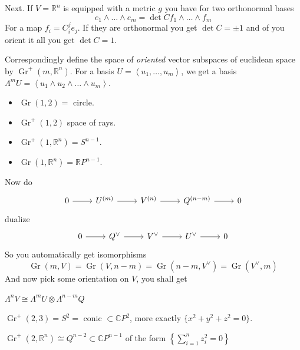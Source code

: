 Next. If \(V=\mathbb{R}^n\) is equipped with a metric \(g\) you have for two orthonormal bases
\[e_1 \wedge \ldots \wedge e_m=\det C f_1\wedge \ldots \wedge f_m\]
For a map \(f_i=C_i^j e_j\). If they are orthonormal you get \(\det C=\pm 1\) and of you orient it all you get \(\det C=1\).

Correspondingly define the space of \textit{oriented} vector subspaces of euclidean space by \(\operatorname{Gr}^+(m,\mathbb{R}^n)\).
For a basis \(U=\left<u_1,\ldots,u_m\right>\), we get a basis \(\Lambda^{m}U=\left<u_1\wedge u_2\wedge\ldots \wedge u_m\right>\).


\begin{example}\leavevmode
\begin{itemize}
\item \(\operatorname{Gr}(1,2)=\) circle.
\item \(\operatorname{Gr}^+(1,2)\) space of rays.
\item \(\operatorname{Gr}^+(1,\mathbb{R}^n)=S^{n-1}\).
\item \(\operatorname{Gr}(1,\mathbb{R}^n)=\mathbb{R}P^{n-1}\).
\end{itemize}
\end{example}

Now do
\[\begin{tikzcd}0\arrow[r]&U^{(m)}\arrow[r]&V^{(n)}\arrow[r]&Q^{(n-m)}\arrow[r]&0\end{tikzcd}\]
dualize
\[\begin{tikzcd}0\arrow[r]&Q^\vee\arrow[r]&V^\vee\arrow[r]&U^\vee\arrow[r]&0\end{tikzcd}\]
So you automatically get isomorphisms
\[\operatorname{Gr}(m,V)=\operatorname{Gr}(V,n-m)=\operatorname{Gr}(n-m,V^\vee)=\operatorname{Gr}(V^\vee,m)\]
And now pick some orientation on \(V\), you shall get 
\begin{exercise}\leavevmode
\(\Lambda^{n}V \cong \Lambda^{m}U \otimes \Lambda^{n-m}Q\)
\end{exercise}

\begin{example}\leavevmode
\(\operatorname{Gr}^+(2,3)=S^2=\) conic \(\subset\mathbb{C}P^{2}\), more exactly \(\{x^2+y^2+z^2=0\}\).
\end{example}

\begin{exercise}\leavevmode
\(\operatorname{Gr}^+(2,\mathbb{R}^n)\cong Q^{n-2}\subset \mathbb{C}P^{n-1}\) of the form \(\left\{\sum_{i=1}^n z_i^2=0\right\}\)
\end{exercise}

